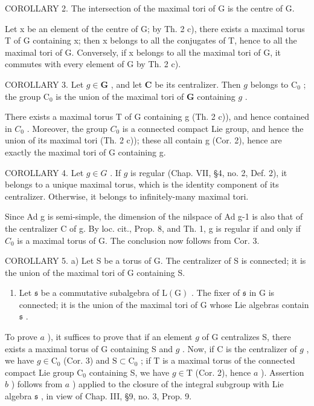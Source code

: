 COROLLARY 2. The intersection of the maximal tori of G is the centre of G.

Let x be an element of the centre of G; by Th. 2 c), there exists a maximal torus T of G containing x; then x belongs to all the conjugates of T, hence to all the maximal tori of G. Conversely, if x belongs to all the maximal tori of G, it commutes with every element of G by Th. 2 c).

COROLLARY 3. Let \(g \in \mathbf{G}\) , and let \(\mathbf{C}\) be its centralizer. Then \(g\) belongs to \(\mathrm{C}_0\) ; the group \(\mathrm{C}_0\) is the union of the maximal tori of \(\mathbf{G}\) containing \(g\) .

There exists a maximal torus T of G containing g (Th. 2 c)), and hence contained in \(C_{0}\) . Moreover, the group \(C_{0}\) is a connected compact Lie group, and hence the union of its maximal tori (Th. 2 c)); these all contain g (Cor. 2), hence are exactly the maximal tori of G containing g.

COROLLARY 4. Let \(g \in G\) . If \(g\) is regular (Chap. VII, §4, no. 2, Def. 2), it belongs to a unique maximal torus, which is the identity component of its centralizer. Otherwise, it belongs to infinitely-many maximal tori.

Since Ad g is semi-simple, the dimension of the nilspace of Ad g-1 is also that of the centralizer C of g. By loc. cit., Prop. 8, and Th. 1, g is regular if and only if \(C_{0}\) is a maximal torus of G. The conclusion now follows from Cor. 3.

COROLLARY 5. a) Let S be a torus of G. The centralizer of S is connected; it is the union of the maximal tori of G containing S.

\begin{enumerate}
\def\labelenumi{\alph{enumi})}
\setcounter{enumi}{1}
\tightlist
\item
  Let \(\mathfrak{s}\) be a commutative subalgebra of \(\mathrm{L}(\mathrm{G})\) . The fixer of \(\mathfrak{s}\) in \(\mathrm{G}\) is connected; it is the union of the maximal tori of \(\mathrm{G}\) whose Lie algebras contain \(\mathfrak{s}\) .
\end{enumerate}

To prove \(a\) ), it suffices to prove that if an element \(g\) of G centralizes S, there exists a maximal torus of G containing S and \(g\) . Now, if C is the centralizer of \(g\) , we have \(g \in \mathrm{C}_0\) (Cor. 3) and \(\mathrm{S} \subset \mathrm{C}_0\) ; if T is a maximal torus of the connected compact Lie group \(\mathrm{C}_0\) containing S, we have \(g \in \mathrm{T}\) (Cor. 2), hence \(a\) ). Assertion \(b\) ) follows from \(a\) ) applied to the closure of the integral subgroup with Lie algebra \(\mathfrak{s}\) , in view of Chap. III, §9, no. 3, Prop. 9.

